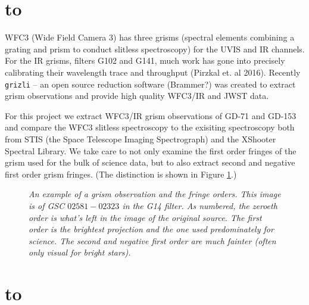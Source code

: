 \documentclass[12pt]{article}
\def\ssectionstar#1{\section*{\hbox to \hsize{\large\bf #1\hfill}}}
\begin{document}
\ssectionstar{Introduction}
\normalsize{

WFC3 (Wide Field Camera 3) has three grisms (spectral elements combining a grating and prism 
to conduct slitless spectroscopy) for the UVIS and IR channels. For the IR grisms, filters 
G102 and G141, much work has gone into precisely calibrating their wavelength trace and throughput (Pirzkal et. al 2016). 
Recently \texttt{grizli} -- an open source reduction software (Brammer?) was created to extract grism observations 
and provide high quality WFC3/IR and JWST data. 

For this project we extract WFC3/IR grism
observations of GD-71 and GD-153 and compare the WFC3 slitless spectroscopy to the exisiting spectroscopy
both from STIS (the Space Telescope Imaging Spectrograph) and the XShooter Spectral Library. We take care
to not only examine the first order fringes of the grism used for the bulk of science data, but to also 
extract second and negative first order grism fringes. (The distinction is shown in Figure \ref{fig:grism_orders}.)

\begin{figure}[h!]
\caption{\textit{An example of a grism observation and the fringe orders. This image is of
    GSC $02581-02323$ in the G14 filter. As numbered, 
    the zeroeth order is what's left in the image of the original source. The first order is
    the brightest projection and the one used predominately for science. The second and negative first 
    order are much fainter (often only visual for bright stars).}}
\label{fig:grism_orders}
\end{figure}



\ssectionstar{Data}
\normalsize{

}}
\end{document}
